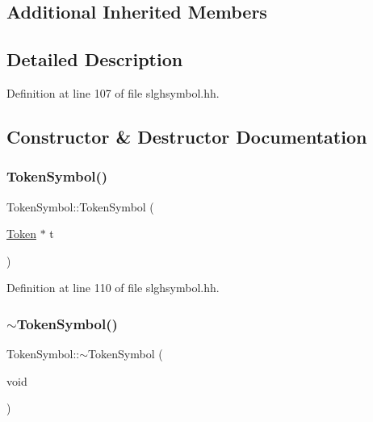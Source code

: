 \subsection*{Additional Inherited Members}


\subsection{Detailed Description}


Definition at line 107 of file slghsymbol.\+hh.



\subsection{Constructor \& Destructor Documentation}
\mbox{\label{class_token_symbol_ad42d6513d25f353332060fa5443418fe}} 
\subsubsection{\texorpdfstring{TokenSymbol()}{TokenSymbol()}}
{\footnotesize\ttfamily Token\+Symbol\+::\+Token\+Symbol (\begin{DoxyParamCaption}\item[{\mbox{\hyperlink{class_token}{Token}} $\ast$}]{t }\end{DoxyParamCaption})\hspace{0.3cm}{\ttfamily [inline]}}



Definition at line 110 of file slghsymbol.\+hh.

\mbox{\label{class_token_symbol_a6102524fb0f6d6e7583fc9d00c431634}} 
\subsubsection{\texorpdfstring{$\sim$TokenSymbol()}{~TokenSymbol()}}
{\footnotesize\ttfamily Token\+Symbol\+::$\sim$\+Token\+Symbol (\begin{DoxyParamCaption}\item[{void}]{ }\end{DoxyParamCaption})\hspace{0.3cm}{\ttfamily [inline]}}



